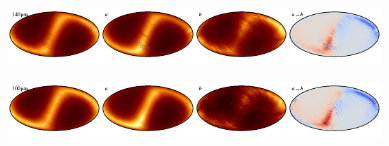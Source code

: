 \documentclass{aa}
\begin{document}
\begin{figure}
    \includegraphics[width=0.22\textwidth]{figs/zodi/zodi_09_tot.pdf}\includegraphics[width=0.22\textwidth]{figs/zodi/zodi_09_a.pdf}\includegraphics[width=0.22\textwidth]{figs/zodi/zodi_02_b.pdf}\includegraphics[width=0.22\textwidth]{figs/zodi/zodi_09_a-b.pdf}
    \vspace{-0.3cm}

    \includegraphics[width=0.22\textwidth]{figs/zodi/zodi_08_tot.pdf}\includegraphics[width=0.22\textwidth]{figs/zodi/zodi_08_a.pdf}\includegraphics[width=0.22\textwidth]{figs/zodi/zodi_03_b.pdf}\includegraphics[width=0.22\textwidth]{figs/zodi/zodi_08_a-b.pdf}
    \vspace{-0.3cm}


\end{figure}
\end{document}
